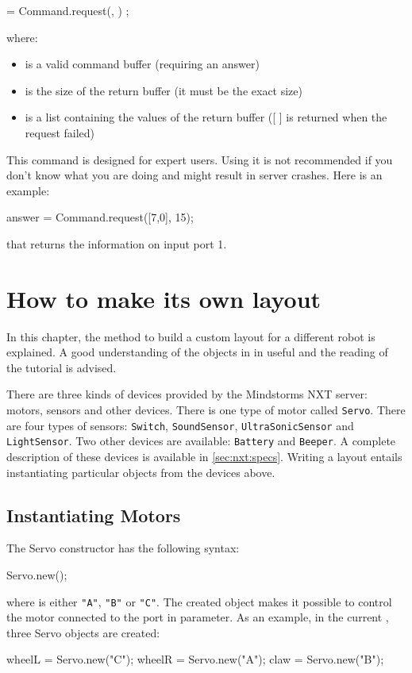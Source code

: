 \begin{urbiunchecked}
 = Command.request(, ) ;
\end{urbiunchecked}

where:
\begin{itemize}
\item {} is a valid command buffer (requiring an answer)
\item {} is the size of the return buffer (it must be the exact
  size)
\item {} is a list containing the values of the return buffer ([ ]
  is returned when the request failed)
\end{itemize}

This command is designed for expert users. Using it is not recommended if you
don't know what you are doing and might result in server crashes.
Here is an example:
\begin{urbiunchecked}
answer = Command.request([7,0], 15);
\end{urbiunchecked}

that returns the information on input port 1.

\section{How to make its own layout}

In this chapter, the method to build a custom layout for a different robot
is explained. A good understanding of the objects in \urbi in useful and the
reading of the \urbi tutorial is advised.

There are three kinds of devices provided by the Mindstorms NXT server:
motors, sensors and other devices. There is one type of motor called
\lstinline{Servo}. There are four types of sensors: \lstinline{Switch},
\lstinline{SoundSensor}, \lstinline{UltraSonicSensor} and
\lstinline{LightSensor}. Two other devices are available:
\lstinline{Battery} and \lstinline{Beeper}. A complete description of these
devices is available in \autoref{sec:nxt:specs}.  Writing a layout entails
instantiating particular objects from the devices above.

\subsection{Instantiating Motors}
The Servo constructor has the following syntax:
\begin{urbiunchecked}
Servo.new();
\end{urbiunchecked}
\noindent
where  is either \lstinline{"A"}, \lstinline{"B"} or
\lstinline{"C"}. The created object makes it possible to control the motor
connected to the port in parameter.  As an example, in the current
, three Servo objects are created:
\begin{urbiunchecked}
wheelL = Servo.new("C");
wheelR = Servo.new("A");
claw = Servo.new("B");
\end{urbiunchecked}

